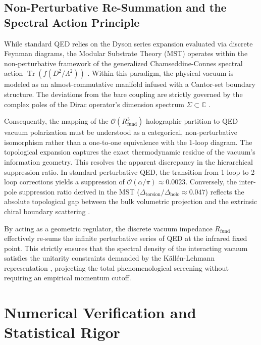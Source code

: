 \documentclass[12pt,a4paper]{article}
\begin{document}
\subsection{Non-Perturbative Re-Summation and the Spectral Action Principle}

While standard QED relies on the Dyson series expansion evaluated via discrete Feynman diagrams, the Modular Substrate Theory (MST) operates within the non-perturbative framework of the generalized Chamseddine-Connes spectral action $\operatorname{Tr}(f(D^2/\Lambda^2))$ \cite{chamseddine1997}. Within this paradigm, the physical vacuum is modeled as an almost-commutative manifold infused with a Cantor-set boundary structure. The deviations from the bare coupling are strictly governed by the complex poles of the Dirac operator's dimension spectrum $\Sigma \subset \mathbb{C}$ \cite{connes1996, lapidus2006}.

Consequently, the mapping of the $\mathcal{O}(R_{\text{fund}}^3)$ holographic partition to QED vacuum polarization must be understood as a categorical, non-perturbative isomorphism rather than a one-to-one equivalence with the 1-loop diagram. The topological expansion captures the exact thermodynamic residue of the vacuum's information geometry. This resolves the apparent discrepancy in the hierarchical suppression ratio. In standard perturbative QED, the transition from 1-loop to 2-loop corrections yields a suppression of $\mathcal{O}(\alpha/\pi) \approx 0.0023$. Conversely, the inter-pole suppression ratio derived in the MST ($\Delta_{\text{torsion}} / \Delta_{\text{holo}} \approx 0.047$) reflects the absolute topological gap between the bulk volumetric projection and the extrinsic chiral boundary scattering \cite{wang2014}.

By acting as a geometric regulator, the discrete vacuum impedance $R_{\text{fund}}$ effectively re-sums the infinite perturbative series of QED at the infrared fixed point. This strictly ensures that the spectral density of the interacting vacuum satisfies the unitarity constraints demanded by the Källén-Lehmann representation \cite{kallen_lehmann_unitarity}, projecting the total phenomenological screening without requiring an empirical momentum cutoff.


\section{Numerical Verification and Statistical Rigor}
\label{sec:numerical}
\end{document}
